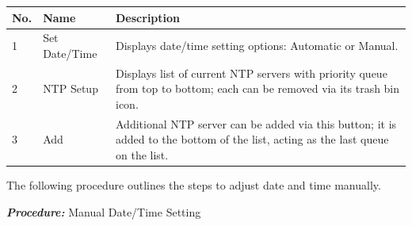 \begin{longtable}[]{@{}lll@{}}
\toprule
\begin{minipage}[b]{0.23\columnwidth}\raggedright
No.\strut
\end{minipage} & \begin{minipage}[b]{0.26\columnwidth}\raggedright
Name\strut
\end{minipage} & \begin{minipage}[b]{0.43\columnwidth}\raggedright
Description\strut
\end{minipage}\tabularnewline
\midrule
\endhead
\begin{minipage}[t]{0.23\columnwidth}\raggedright
1\strut
\end{minipage} & \begin{minipage}[t]{0.26\columnwidth}\raggedright
Set Date/Time\strut
\end{minipage} & \begin{minipage}[t]{0.43\columnwidth}\raggedright
Displays date/time setting options: Automatic or Manual.\strut
\end{minipage}\tabularnewline
\begin{minipage}[t]{0.23\columnwidth}\raggedright
2\strut
\end{minipage} & \begin{minipage}[t]{0.26\columnwidth}\raggedright
NTP Setup\strut
\end{minipage} & \begin{minipage}[t]{0.43\columnwidth}\raggedright
Displays list of current NTP servers with priority queue from top to
bottom; each can be removed via its trash bin icon.\strut
\end{minipage}\tabularnewline
\begin{minipage}[t]{0.23\columnwidth}\raggedright
3\strut
\end{minipage} & \begin{minipage}[t]{0.26\columnwidth}\raggedright
Add\strut
\end{minipage} & \begin{minipage}[t]{0.43\columnwidth}\raggedright
Additional NTP server can be added via this button; it is added to the
bottom of the list, acting as the last queue on the list.\strut
\end{minipage}\tabularnewline
\bottomrule
\end{longtable}

The following procedure outlines the steps to adjust date and time
manually.

\textbf{\emph{Procedure:}} Manual Date/Time Setting

